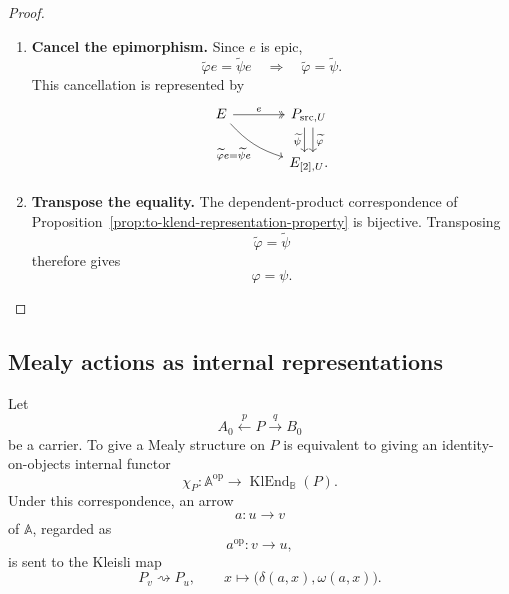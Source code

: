 \begin{proof}
    \leavevmode
    \begin{enumerate}
        \item \textbf{Cancel the epimorphism.}
        Since \(e\) is epic,
        \[
            \widetilde\varphi e
            =
            \widetilde\psi e
            \quad\Longrightarrow\quad
            \widetilde\varphi
            =
            \widetilde\psi.
        \]
        This cancellation is represented by
        \[
        \begin{tikzcd}[column sep=large]
            E
                \arrow[r, two heads, "e"]
                \arrow[dr, bend right=15,
                "\widetilde\varphi e=\widetilde\psi e"']
            &
            P_{\mathrm{src},U}
                \arrow[d, shift left=.7ex, "\widetilde\varphi"]
                \arrow[d, shift right=.7ex, "\widetilde\psi"']
            \\
            &
            E_{[2],U}.
        \end{tikzcd}
        \]

        \item \textbf{Transpose the equality.}
        The dependent-product correspondence of
        Proposition~\ref{prop:to-klend-representation-property} is bijective.
        Transposing
        \[
            \widetilde\varphi=\widetilde\psi
        \]
        therefore gives
        \[
            \varphi=\psi.
        \]
    \end{enumerate}
\end{proof}

\subsection{Mealy actions as internal representations}
\label{subsec:to-mealy-actions-representations}

\begin{theorem}
\label{thm:to-transition-output-representation}
    Let
    \[
        A_0\xleftarrow{p}P\xrightarrow{q}B_0
    \]
    be a carrier. To give a Mealy structure on \(P\) is equivalent to giving an
    identity-on-objects internal functor
    \[
        \chi_P:
        \mathbb A^{\mathrm{op}}
        \to
        \operatorname{KlEnd}_{\mathbb B}(P).
    \]
    Under this correspondence, an arrow
    \[
        a:u\to v
    \]
    of \(\mathbb A\), regarded as
    \[
        a^{\mathrm{op}}:v\to u,
    \]
    is sent to the Kleisli map
    \[
        P_v\rightsquigarrow P_u,
        \qquad
        x\longmapsto
        \bigl(\delta(a,x),\omega(a,x)\bigr).
    \]
\end{theorem}

